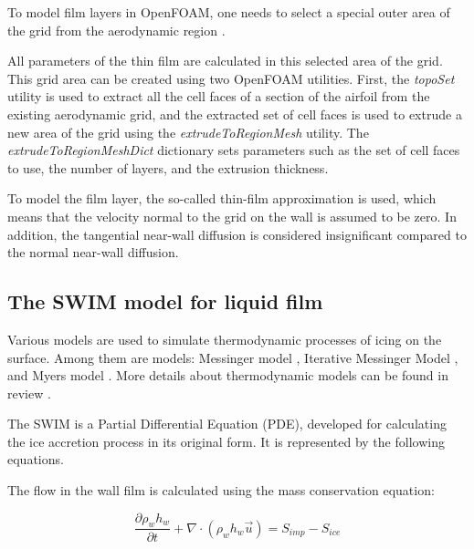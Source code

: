 \documentclass[aerospace,article,submit,moreauthors,pdftex]{Definitions/mdpi}
\begin{document}
To model film layers in OpenFOAM, one needs to select a special outer area of the grid from the aerodynamic region \cite{StrijhakKoshelevMelnikova2021}.

All parameters of the thin film are calculated in this selected area of the grid. This grid area can be created using two OpenFOAM utilities. First, the \emph{topoSet} utility is used to extract all the cell faces of a section of the airfoil from the existing aerodynamic grid, and the extracted set of cell faces is used to extrude a new area of the grid using the \emph{extrudeToRegionMesh} utility. The \emph{extrudeToRegionMeshDict} dictionary sets parameters such as the set of cell faces to use, the number of layers, and the extrusion thickness.

To model the film layer, the so-called thin-film approximation is used, which means that the velocity normal to the grid on the wall is assumed to be zero. In addition, the tangential near-wall diffusion is considered insignificant compared to the normal near-wall diffusion.

\subsection{The SWIM model for liquid film}

Various models are used to simulate thermodynamic processes of icing on the surface. Among them are models: Messinger model \cite{MESSINGER}, Iterative Messinger Model \cite{ZHUFUSUNZHU2012}, and Myers model \cite{Myers2001}.
More details about thermodynamic models can be found in review \cite{Pierre2018}.

The SWIM is a Partial Differential Equation (PDE), developed for calculating the ice accretion process in its original form. It is represented by the following equations.

The flow in the wall film is calculated using the mass conservation equation:

\begin{equation}
    \frac{\partial\rho_{w}h_{w}}{\partial t} + \nabla \cdot \left( \rho_{w}h_{w} \vec u \right) = S_{imp} - S_{ice}    
\end{equation}
\end{document}
